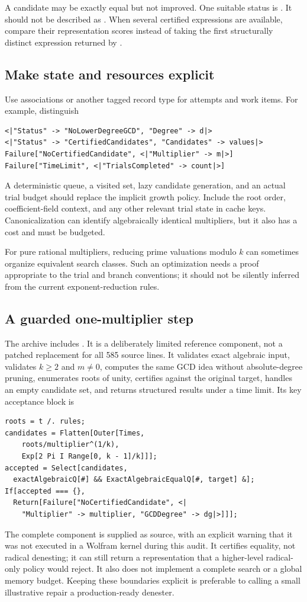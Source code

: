 \documentclass[11pt,letterpaper]{article}
\newcommand{\code}[1]{\texttt{\detokenize{#1}}}
\theoremstyle{definition}
\begin{document}
A candidate may be exactly equal but not improved. One suitable status is
\code{"EqualButNotImproved"}. It should not be described as \code{"Denested"}.
When several certified expressions are available, compare their representation
scores instead of taking the first structurally distinct expression returned by
\code{Solve}.

\subsection{Make state and resources explicit}
Use associations or another tagged record type for attempts and work items. For
example, distinguish
\begin{lstlisting}
<|"Status" -> "NoLowerDegreeGCD", "Degree" -> d|>
<|"Status" -> "CertifiedCandidates", "Candidates" -> values|>
Failure["NoCertifiedCandidate", <|"Multiplier" -> m|>]
Failure["TimeLimit", <|"TrialsCompleted" -> count|>]
\end{lstlisting}
A deterministic queue, a visited set, lazy candidate generation, and an actual
trial budget should replace the implicit growth policy. Include the root order,
coefficient-field context, and any other relevant trial state in cache keys.
Canonicalization can identify algebraically identical multipliers, but it also has
a cost and must be budgeted.

For pure rational multipliers, reducing prime valuations modulo $k$ can sometimes
organize equivalent search classes. Such an optimization needs a proof appropriate
to the trial and branch conventions; it should not be silently inferred from the
current exponent-reduction rules.

\subsection{A guarded one-multiplier step}
The archive includes \code{safer_core.wl}. It is a deliberately limited reference
component, not a patched replacement for all 585 source lines. It validates exact
algebraic input, validates $k\ge2$ and $m\ne0$, computes the same GCD idea without
absolute-degree pruning, enumerates roots of unity, certifies against the original
target, handles an empty candidate set, and returns structured results under a time
limit. Its key acceptance block is
\begin{lstlisting}
roots = t /. rules;
candidates = Flatten[Outer[Times,
    roots/multiplier^(1/k),
    Exp[2 Pi I Range[0, k - 1]/k]]];
accepted = Select[candidates,
  exactAlgebraicQ[#] && ExactAlgebraicEqualQ[#, target] &];
If[accepted === {},
  Return[Failure["NoCertifiedCandidate", <|
    "Multiplier" -> multiplier, "GCDDegree" -> dg|>]]];
\end{lstlisting}
The complete component is supplied as source, with an explicit warning that it was
not executed in a Wolfram kernel during this audit. It certifies equality, not
radical denesting; it can still return a representation that a higher-level
radical-only policy would reject. It also does not implement a complete search or
a global memory budget. Keeping these boundaries explicit is preferable to calling
a small illustrative repair a production-ready denester.
\end{document}
